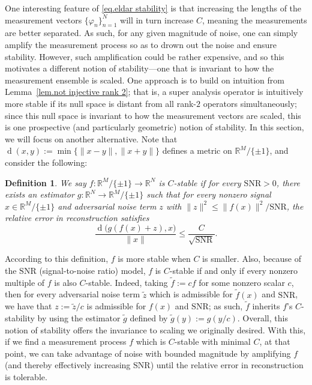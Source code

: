 \documentclass[times,10pt]{elsarticle}
\theoremstyle{plain}
\newtheorem{definition}[theorem]{Definition}
\begin{document}
One interesting feature of \eqref{eq.eldar stability} is that increasing the lengths of the measurement vectors $\{\varphi_n\}_{n=1}^N$ will in turn increase $C$, meaning the measurements are better separated.
As such, for any given magnitude of noise, one can simply amplify the measurement process so as to drown out the noise and ensure stability.
However, such amplification could be rather expensive, and so this motivates a different notion of stability---one that is invariant to how the measurement ensemble is scaled.
One approach is to build on intuition from Lemma~\ref{lem.not injective rank 2}; that is, a super analysis operator is intuitively more stable if its null space is distant from all rank-$2$ operators simultaneously; since this null space is invariant to how the measurement vectors are scaled, this is one prospective (and particularly geometric) notion of stability.
In this section, we will focus on another alternative.
Note that $\operatorname{d}(x,y):=\min\{\|x-y\|,\|x+y\|\}$ defines a metric on $\mathbb{R}^M/\{\pm1\}$, and consider the following:

\begin{definition}
\label{definition.worst-case stability}
We say $f\colon\mathbb{R}^M/\{\pm1\}\rightarrow\mathbb{R}^N$ is \textit{$C$-stable} if for every $\mathrm{SNR}>0$, there exists an estimator $g\colon\mathbb{R}^N\rightarrow\mathbb{R}^M/\{\pm1\}$ such that for every nonzero signal $x\in\mathbb{R}^M/\{\pm1\}$ and adversarial noise term $z$ with $\|z\|^2\leq\|f(x)\|^2/\mathrm{SNR}$, the relative error in reconstruction satisfies
\begin{equation*}
\frac{\operatorname{d}\big(g(f(x)+z),x\big)}{\|x\|}
\leq\frac{C}{\sqrt{\mathrm{SNR}}}.
\end{equation*}
\end{definition}

According to this definition, $f$ is more stable when $C$ is smaller.
Also, because of the $\mathrm{SNR}$ (signal-to-noise ratio) model, $f$ is $C$-stable if and only if every nonzero multiple of $f$ is also $C$-stable.
Indeed, taking $\tilde{f}:=cf$ for some nonzero scalar $c$, then for every adversarial noise term $\tilde{z}$ which is admissible for $\tilde{f}(x)$ and $\mathrm{SNR}$, we have that $z:=\tilde{z}/c$ is admissible for $f(x)$ and $\mathrm{SNR}$; as such, $\tilde{f}$ inherits $f$'s $C$-stability by using the estimator $\tilde{g}$ defined by $\tilde{g}(y):=g(y/c)$.
Overall, this notion of stability offers the invariance to scaling we originally desired.
With this, if we find a measurement process $f$ which is $C$-stable with minimal $C$, at that point, we can take advantage of noise with bounded magnitude by amplifying $f$ (and thereby effectively increasing $\mathrm{SNR}$) until the relative error in reconstruction is tolerable.
\end{document}
